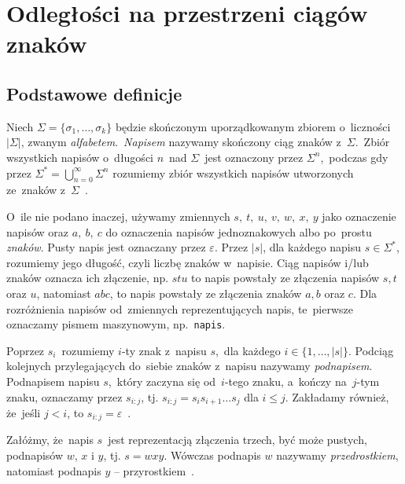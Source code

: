 \documentclass{praca1}
\begin{document}
\chapter{Odległości na przestrzeni ciągów znaków}
\label{metryki-na-przestrzeni-ciagow-znakow}


\section{Podstawowe definicje}


\begin{definition}
Niech  $\Sigma = \{\sigma_1, \ldots, \sigma_k\}$ będzie skończonym uporządkowanym zbiorem o~liczności $|\Sigma|$, zwanym \emph{alfabetem}.~\emph{Napisem} nazywamy skończony ciąg znaków z~$\Sigma$.~Zbiór wszystkich napisów o~długości $n$~nad $\Sigma$~jest oznaczony przez $\Sigma^n$,~podczas gdy przez $\Sigma^* = \bigcup_{n=0}^{\infty}\Sigma^n$ rozumiemy zbiór wszystkich napisów utworzonych ze~znaków z~$\Sigma$~\cite{Boytsov2011:indexingmethods}.
\end{definition}

O~ile nie podano inaczej, używamy zmiennych $s,\ t,\ u,\ v,\ w,\ x,\ y$ jako oznaczenie napisów oraz $a,\ b,\ c$ do oznaczenia napisów jednoznakowych albo po~prostu \emph{znaków}. Pusty napis jest oznaczany przez $\varepsilon$. Przez $|s|$, dla każdego napisu $s \in \Sigma^*$, rozumiemy jego długość, czyli liczbę znaków w~napisie. Ciąg napisów i/lub znaków oznacza ich złączenie, np. $stu$ to napis powstały ze złączenia napisów $s, t$ oraz $u$, natomiast $abc$, to napis powstały ze złączenia znaków $a, b$ oraz $c$. Dla rozróżnienia napisów od~zmiennych reprezentujących napis, te~pierwsze oznaczamy pismem maszynowym, np.~\verb|napis|.

Poprzez $s_i$~rozumiemy $i$-ty znak z~napisu $s$,~dla każdego $i \in \{1,\ldots,|s|\}$. Podciąg kolejnych przylegających do~siebie znaków z~napisu nazywamy \emph{podnapisem}. Podnapisem napisu $s$,~który zaczyna się od~$i$-tego znaku, a~kończy na~$j$-tym znaku, oznaczamy przez $s_{i:j}$, tj. $s_{i:j} = s_is_{i+1}\ldots s_j$ dla $i \leq j$. Zakładamy również, że~jeśli $j < i$, to $s_{i:j} = \varepsilon$~\cite{Boytsov2011:indexingmethods,Loo2014:stringdist}.

\begin{definition}
Załóżmy, że~napis $s$~jest reprezentacją złączenia trzech, być może pustych, podnapisów $w$, $x$ i $y$, tj. $s = wxy$. Wówczas podnapis $w$ nazywamy \emph{przedrostkiem}, natomiast podnapis $y$ -- przyrostkiem~\cite{Boytsov2011:indexingmethods}.
\end{definition}
\end{document}
